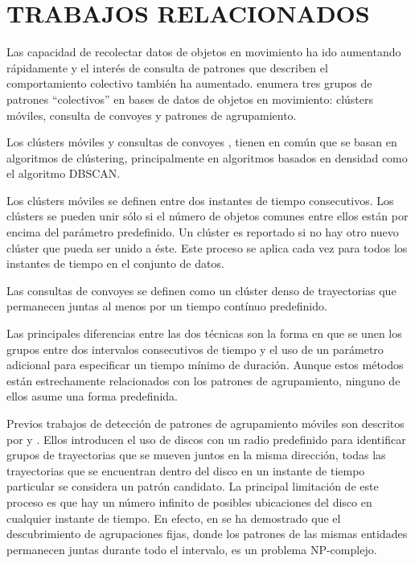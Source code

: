 \chapter{TRABAJOS RELACIONADOS}

Las capacidad de recolectar datos de objetos en movimiento ha ido aumentando 
rápidamente y el interés de consulta
de patrones que describen el comportamiento colectivo también ha aumentado. 
\cite{vieira2009line} enumera tres grupos de patrones
``colectivos'' en bases de datos de objetos en movimiento: clústers móviles, 
consulta de convoyes y patrones de agrupamiento.

Los clústers móviles \cite{jensen2007continuous} \cite{kalnis2005discovering} 
\cite{li2008mining} 
y  consultas de convoyes  \cite{jeung2008discovery-1} \cite{jeung2008convoy}, 
tienen en común que se basan en algoritmos
de clústering, principalmente en algoritmos basados en densidad como el 
algoritmo DBSCAN\cite{ester1996density}.

Los clústers móviles se definen entre dos instantes de tiempo consecutivos. Los 
clústers  se pueden unir sólo si el número de objetos comunes entre ellos están 
por encima del parámetro predefinido.
Un clúster es reportado si no hay otro nuevo clúster que pueda ser unido a éste. 
Este proceso se aplica cada vez para 
todos los instantes de tiempo en el conjunto de datos. 

Las consultas de convoyes se definen como un clúster denso de trayectorias que 
permanecen juntas al menos por un tiempo contínuo predefinido. 

Las principales diferencias entre las dos técnicas son la forma en que se unen 
los grupos  entre dos intervalos
consecutivos de tiempo y el uso de un parámetro adicional para especificar un 
tiempo mínimo de duración. Aunque
estos métodos están estrechamente relacionados con los patrones de agrupamiento, 
ninguno de ellos asume una  forma predefinida.

Previos trabajos de detección de patrones de agrupamiento móviles son descritos 
por \cite{ gudmundsson2006computing}
y \cite{benkert2008reporting}. Ellos introducen
el uso de discos con un radio predefinido para identificar  grupos de 
trayectorias que se mueven juntos en la misma
dirección, todas las trayectorias que se encuentran dentro del disco en un 
instante  de tiempo particular se 
considera un patrón candidato. La principal limitación de este proceso es que 
hay un número infinito de posibles
ubicaciones del disco en cualquier instante de tiempo. En efecto, en 
\cite{gudmundsson2006computing} se ha demostrado
que el descubrimiento de agrupaciones fijas, donde los patrones de las mismas 
entidades permanecen juntas durante 
todo el intervalo, es un problema NP-complejo. 

